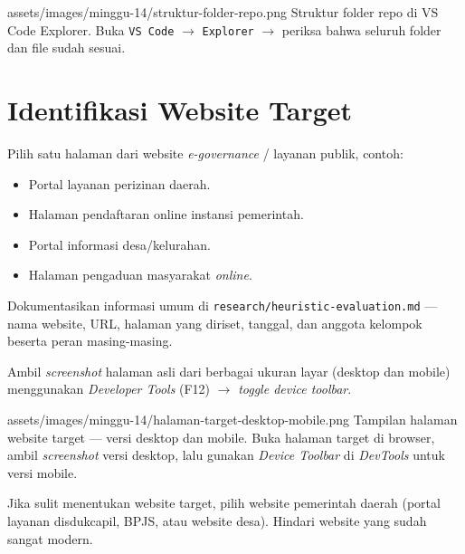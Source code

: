 \begin{tangkapanlayar}
  {assets/images/minggu-14/struktur-folder-repo.png}
  {Struktur folder repo di VS Code Explorer.}
  {Buka \texttt{VS Code} $\rightarrow$ \texttt{Explorer} $\rightarrow$ periksa bahwa seluruh folder dan file sudah sesuai.}
\end{tangkapanlayar}

\section{Identifikasi Website Target}
\label{sec:website-target}

\begin{langkah}
  \item Pilih satu halaman dari website \emph{e-governance} / layanan publik, contoh:
  \begin{itemize}
    \item Portal layanan perizinan daerah.
    \item Halaman pendaftaran online instansi pemerintah.
    \item Portal informasi desa/kelurahan.
    \item Halaman pengaduan masyarakat \emph{online}.
  \end{itemize}
  \item Dokumentasikan informasi umum di \texttt{research/heuristic-evaluation.md} --- nama website, URL, halaman yang diriset, tanggal, dan anggota kelompok beserta peran masing-masing.
  \item Ambil \emph{screenshot} halaman asli dari berbagai ukuran layar (desktop dan mobile) menggunakan \emph{Developer Tools} (F12) $\rightarrow$ \emph{toggle device toolbar}.
\end{langkah}

\begin{tangkapanlayar}
  {assets/images/minggu-14/halaman-target-desktop-mobile.png}
  {Tampilan halaman website target --- versi desktop dan mobile.}
  {Buka halaman target di browser, ambil \emph{screenshot} versi desktop, lalu gunakan \emph{Device Toolbar} di \emph{DevTools} untuk versi mobile.}
\end{tangkapanlayar}

\begin{tip}
Jika sulit menentukan website target, pilih website pemerintah daerah (portal layanan disdukcapil, BPJS, atau website desa). Hindari website yang sudah sangat modern.
\end{tip}

